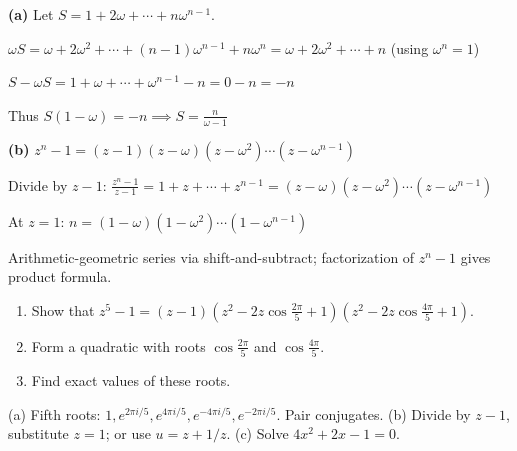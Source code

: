 \begin{solution}
\textbf{(a)} Let $S = 1+2\omega+\cdots+n\omega^{n-1}$.

$\omega S = \omega+2\omega^2+\cdots+(n-1)\omega^{n-1}+n\omega^n = \omega+2\omega^2+\cdots+n$ (using $\omega^n=1$)

$S-\omega S = 1+\omega+\cdots+\omega^{n-1}-n = 0-n = -n$

Thus $S(1-\omega)=-n \implies S = \frac{n}{\omega-1}$

\textbf{(b)} $z^n-1 = (z-1)(z-\omega)(z-\omega^2)\cdots(z-\omega^{n-1})$

Divide by $z-1$: $\frac{z^n-1}{z-1} = 1+z+\cdots+z^{n-1} = (z-\omega)(z-\omega^2)\cdots(z-\omega^{n-1})$

At $z=1$: $n = (1-\omega)(1-\omega^2)\cdots(1-\omega^{n-1})$

\end{solution}

\begin{takeaways}
Arithmetic-geometric series via shift-and-subtract; factorization of $z^n-1$ gives product formula.
\end{takeaways}

\vspace{1cm}

\begin{problem}
\begin{enumerate}
    \item Show that $z^5 - 1 = (z-1)(z^2 - 2z \cos \frac{2\pi}{5} + 1)(z^2 - 2z \cos \frac{4\pi}{5} + 1)$.
    \item Form a quadratic with roots $\cos \frac{2\pi}{5}$ and $\cos \frac{4\pi}{5}$.
    \item Find exact values of these roots.
\end{enumerate}
\end{problem}

\vspace{0.5cm}
\begin{hintbox}
(a) Fifth roots: $1, e^{2\pi i/5}, e^{4\pi i/5}, e^{-4\pi i/5}, e^{-2\pi i/5}$. Pair conjugates. (b) Divide by $z-1$, substitute $z=1$; or use $u=z+1/z$. (c) Solve $4x^2+2x-1=0$.
\end{hintbox}

